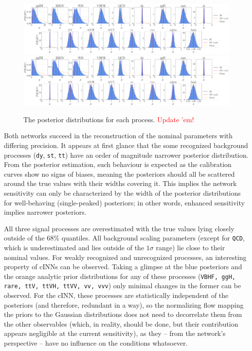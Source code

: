 \begin{figure}[h!]
	\centering
	\includegraphics[width=\linewidth]{figures/inference/finalNoSummarye11000_posteriors}
	\includegraphics[width=\linewidth]{figures/inference/finalSummary1Layer11000e300NodesCdim100_posteriors}
	\caption{The posterior distributions for each process. \textcolor{red}{Update 'em!}}
	\label{fig:posteriors}
\end{figure}

Both networks succeed in the reconstruction of the nominal parameters with differing precision. It appears at first glance that the some recognized background processes (\texttt{dy}, \texttt{st}, \texttt{tt}) have an order of magnitude narrower posterior distribution. From the posterior estimation, such behaviour is expected as the calibration curves show no signs of biases, meaning the posteriors should all be scattered around the true values with their widths covering it. This implies the network sensitivity can only be characterized by the width of the posterior distributions for well-behaving (single-peaked) posteriors; in other words, enhanced sensitivity implies narrower posteriors.

All three signal processes are overestimated with the true values lying closely outside of the 68\% quantiles. All background scaling parameters (except for \texttt{QCD}, which is underestimated and lies outside of the $1\sigma$ range) lie close to their nominal values.
For weakly recognized and unrecognized processes, an interesting property of cINNs can be observed. Taking a glimpse at the blue posteriors and the orange analytic prior distributions for any of these processes (\texttt{VBHF, ggH, rare, ttV, ttVH, ttVV, vv, vvv}) only minimal changes in the former can be observed. For the cINN, these processes are statistically independent of the posteriors (and therefore, redundant in a way), so the normalizing flow mapping the priors to the Gaussian distributions does not need to decorrelate them from the other observables (which, in reality, should be done, but their contribution appears negligible at the current sensitivity), as they -- from the network's perspective -- have no influence on the conditions whatsoever.

